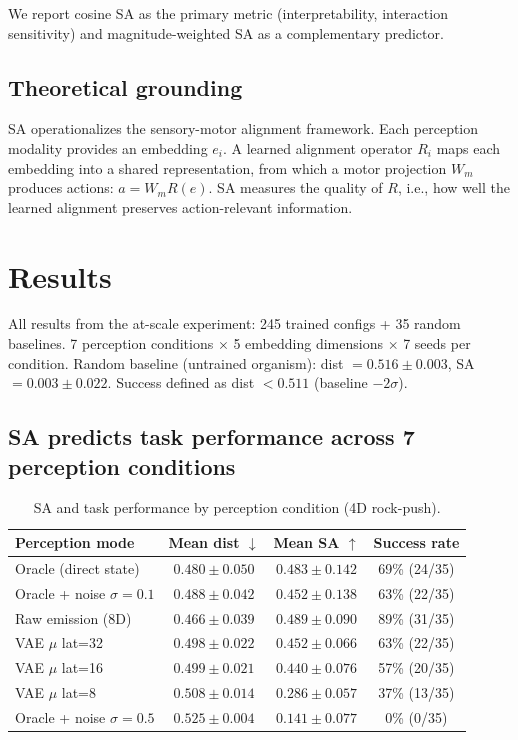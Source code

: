 \documentclass{article}
\begin{document}
We report cosine SA as the primary metric (interpretability, interaction
sensitivity) and magnitude-weighted SA as a complementary predictor.

\subsection{Theoretical grounding}

SA operationalizes the sensory-motor alignment framework. Each perception modality
provides an embedding $e_i$. A learned alignment operator $R_i$ maps each
embedding into a shared representation, from which a motor projection $W_m$
produces actions: $a = W_m R(e)$. SA measures the quality of $R$, i.e., how well
the learned alignment preserves action-relevant information.

\section{Results}
\label{sec:results}

All results from the at-scale experiment: 245 trained configs + 35 random
baselines. 7 perception conditions $\times$ 5 embedding dimensions $\times$ 7
seeds per condition. Random baseline (untrained organism): dist $= 0.516 \pm
0.003$, SA $= 0.003 \pm 0.022$. Success defined as dist $< 0.511$ (baseline
$- 2\sigma$).

\subsection{SA predicts task performance across 7 perception conditions}

\begin{table}[h]
\centering
\caption{SA and task performance by perception condition (4D rock-push).}
\label{tab:conditions}
\begin{tabular}{lccc}
\toprule
Perception mode & Mean dist $\downarrow$ & Mean SA $\uparrow$ & Success rate \\
\midrule
Oracle (direct state) & $0.480 \pm 0.050$ & $0.483 \pm 0.142$ & 69\% (24/35) \\
Oracle + noise $\sigma{=}0.1$ & $0.488 \pm 0.042$ & $0.452 \pm 0.138$ & 63\% (22/35) \\
Raw emission (8D) & $0.466 \pm 0.039$ & $0.489 \pm 0.090$ & 89\% (31/35) \\
VAE $\mu$ lat=32 & $0.498 \pm 0.022$ & $0.452 \pm 0.066$ & 63\% (22/35) \\
VAE $\mu$ lat=16 & $0.499 \pm 0.021$ & $0.440 \pm 0.076$ & 57\% (20/35) \\
VAE $\mu$ lat=8 & $0.508 \pm 0.014$ & $0.286 \pm 0.057$ & 37\% (13/35) \\
Oracle + noise $\sigma{=}0.5$ & $0.525 \pm 0.004$ & $0.141 \pm 0.077$ & 0\% (0/35) \\
\bottomrule
\end{tabular}
\end{table}
\end{document}
